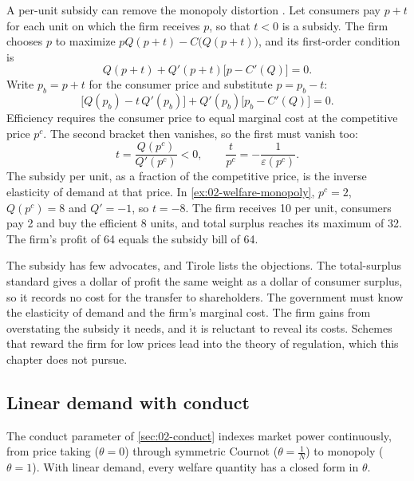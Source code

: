 \begin{remark}\label{rem:02-subsidy}
A per-unit subsidy can remove the monopoly distortion \citep[sec.~1.1.1.3]{Tirole1988}. Let consumers pay $p + t$
for each unit on which the firm receives $p$, so that $t < 0$ is a subsidy. The firm chooses $p$ to maximize
$pQ(p + t) - C\bigl(Q(p + t)\bigr)$, and its first-order condition is
\[
  Q(p + t) + Q'(p + t)\bigl[p - C'(Q)\bigr] = 0 .
\]
Write $p_b = p + t$ for the consumer price and substitute $p = p_b - t$:
\[
  \bigl[Q(p_b) - t\,Q'(p_b)\bigr] + Q'(p_b)\bigl[p_b - C'(Q)\bigr] = 0 .
\]
Efficiency requires the consumer price to equal marginal cost at the competitive price $p^c$. The second bracket
then vanishes, so the first must vanish too:
\[
  t = \frac{Q(p^c)}{Q'(p^c)} < 0, \qquad \frac{t}{p^c} = -\frac{1}{\varepsilon(p^c)} .
\]
The subsidy per unit, as a fraction of the competitive price, is the inverse elasticity of demand at that price. In
\cref{ex:02-welfare-monopoly}, $p^c = 2$, $Q(p^c) = 8$ and $Q' = -1$, so $t = -8$. The firm receives 10 per unit,
consumers pay 2 and buy the efficient 8 units, and total surplus reaches its maximum of 32. The firm's profit of 64
equals the subsidy bill of 64.

The subsidy has few advocates, and Tirole lists the objections. The total-surplus standard gives a dollar of profit
the same weight as a dollar of consumer surplus, so it records no cost for the transfer to shareholders. The
government must know the elasticity of demand and the firm's marginal cost. The firm gains from overstating the
subsidy it needs, and it is reluctant to reveal its costs. Schemes that reward the firm for low prices lead into the
theory of regulation, which this chapter does not pursue.
\end{remark}

\subsection{Linear demand with conduct}\label{sec:02-dwl-linear}

The conduct parameter of \cref{sec:02-conduct} indexes market power continuously, from price taking ($\theta = 0$)
through symmetric Cournot ($\theta = \frac{1}{N}$) to monopoly ($\theta = 1$). With linear demand, every welfare
quantity has a closed form in $\theta$.


